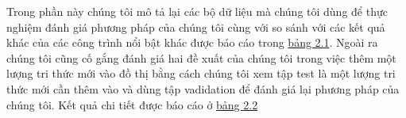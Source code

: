 Trong phần này chúng tôi mô tả lại các bộ dữ liệu mà chúng tôi dùng để thực nghiệm đánh giá phương pháp của chúng tôi cùng với so sánh với các kết quả khác của các công trình nổi bật khác được báo cáo trong \hyperref[tab:tab1]{bảng 2.1}. Ngoài ra chúng tôi cũng cố gắng đánh giá hai đề xuất của chúng tôi trong việc thêm một lượng tri thức mới vào đồ thị bằng cách chúng tôi xem tập test là một lượng tri thức mới cần thêm vào và dùng tập vadidation để đánh giá lại phương pháp của chúng tôi. Kết quả chi tiết được báo cáo ở \hyperref[tab:tab1]{bảng 2.2}

\begin{table}[htbp]
	\begin{center}
		\caption{Thông tin các tập dữ liệu}
		\label{tab:datasetInfo}
	\end{center}
\end{table}

